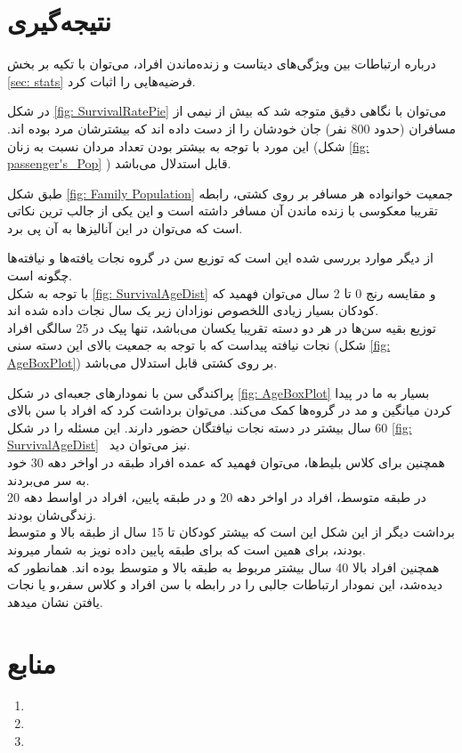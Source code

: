 \documentclass{article}
\begin{document}
	\section*{نتیجه‌گیری}
	درباره ارتباطات بین ویژگی‌های دیتاست و زنده‌ماندن افراد، می‌توان با تکیه بر بخش 
	\ref{sec: stats}
	فرضیه‌هایی را اثبات کرد.
	
	در شکل 
	\ref{fig: SurvivalRatePie}
	می‌توان با نگاهی دقیق متوجه شد که بیش از نیمی از مسافران (حدود 800 نفر) جان خودشان را از دست داده اند که بیشترشان مرد بوده اند. این مورد با توجه به بیشتر بودن تعداد مردان نسبت به زنان 
	(شکل
	\ref{fig: passenger's_Pop}
	)
	 قابل استدلال می‌باشد.
	 
	 طبق شکل 
	 \ref{fig: Family Population}
	 جمعیت خوانواده هر مسافر بر روی کشتی، رابطه تقریبا معکوسی با زنده ماندن آن مسافر داشته است و این یکی از جالب ترین نکاتی‌ است که می‌توان در این آنالیزها به آن پی برد.
	 
	 از دیگر موارد بررسی شده این است که توزیع سن در گروه نجات یافته‌ها و نیافته‌ها چگونه است.\\
	 با توجه به شکل 
	 \ref{fig: SurvivalAgeDist}
	 و مقایسه رنج 0 تا 2 سال می‌توان فهمید که کودکان بسیار زیادی اللخصوص نوزادان زیر یک سال نجات داده شده اند.\\
	 توزیع بقیه سن‌ها در هر دو دسته تقریبا یکسان می‌باشد، تنها پیک در 25 سالگی افراد نجات نیافته پیداست  که با توجه به جمعیت بالای این دسته سنی 
	 (شکل 
	 \ref{fig: AgeBoxPlot})
	  بر روی کشتی قابل استدلال می‌باشد.
	  
	  پراکندگی سن با نمودارهای جعبه‌ای در شکل 
	  \ref{fig: AgeBoxPlot}
	  بسیار به ما در پیدا کردن میانگین و مد در گروه‌ها کمک می‌کند.
	  می‌توان برداشت کرد که افراد با سن بالای 60 سال بیشتر در دسته نجات نیافتگان حضور دارند. این مسئله را در شکل
	  \ref{fig: SurvivalAgeDist}
	  ~نیز می‌توان دید.\\
	  همچنین برای کلاس بلیط‌ها، می‌توان فهمید که عمده افراد طبقه 
	  در اواخر دهه 30 خود به سر می‌بردند.\\
	  در طبقه متوسط، افراد در اواخر دهه 20 و در طبقه پایین، افراد در اواسط دهه 20 زندگی‌شان بودند.\\
	  برداشت دیگر از این شکل این است که بیشتر کودکان تا 15 سال از طبقه بالا و متوسط بودند، برای همین است که برای طبقه پایین داده نویز به شمار میروند.\\
	  همچنین افراد بالا 40 سال بیشتر مربوط به طبقه بالا و متوسط بوده اند. همانطور که دیده‌شد، این نمودار ارتباطات جالبی را در رابطه با سن افراد و کلاس سفر،‌و یا نجات یافتن نشان میدهد.
	  
	  \section*{منابع}
	  
	 \begin{enumerate}
	 	\item {}
	 	\item {}
	 	\item {}
	 \end{enumerate}
\end{document}
